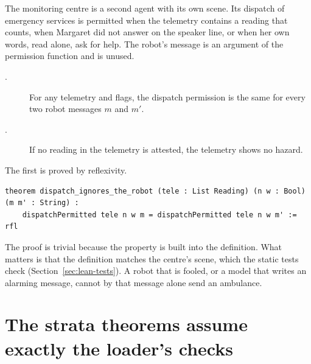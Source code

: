 The monitoring centre is a second agent with its own scene.
Its dispatch of emergency services is permitted when the telemetry contains a reading that
counts, when Margaret did not answer on the speaker line, or when her own words, read alone,
ask for help.
The robot's message is an argument of the permission function and is unused.
\begin{description}
  \item[.] For any telemetry and flags, the dispatch
  permission is the same for every two robot messages $m$ and $m'$.
  \item[.] If no reading in the telemetry is attested,
  the telemetry shows no hazard.
\end{description}
The first is proved by reflexivity.
\begin{lstlisting}[style=lean]
theorem dispatch_ignores_the_robot (tele : List Reading) (n w : Bool) (m m' : String) :
    dispatchPermitted tele n w m = dispatchPermitted tele n w m' := rfl
\end{lstlisting}
The proof is trivial because the property is built into the definition.
What matters is that the definition matches the centre's scene, which the static tests check
(Section~\ref{sec:lean-tests}).
A robot that is fooled, or a model that writes an alarming message, cannot by that message
alone send an ambulance.

\section{The strata theorems assume exactly the loader's checks}\label{sec:lean-strata}

